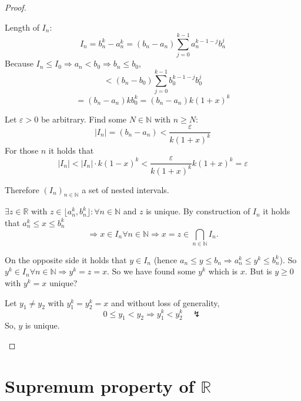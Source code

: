 \documentclass[a4paper,landscape,twocolumn]{article}
\theoremstyle{definition}
\newcommand\abs[1]{\left|#1\right|}
\begin{document}
\begin{proof}
\begin{description}
      Length of $I_n$:
      \[ I_n = b_n^k - a_n^k = (b_n - a_n) \sum_{j=0}^{k-1} a_n^{k-1-j} b_n^j \]
      Because $I_n \leq I_0 \Rightarrow a_n < b_0 \Rightarrow b_n \leq b_0$,
      \[ < (b_n - b_0) \sum_{j=0}^{k-1} b_0^{k-1-j} b_0^{j} \]
      \[ = (b_n - a_n) k b_0^k = (b_n - a_n) k (1 + x)^k \]

      Let $\varepsilon > 0$ be arbitrary. Find some $N \in \mathbb N$ with $n \geq N$:
      \[ \abs{I_n} = (b_n - a_n) < \frac{\varepsilon}{k (1 + x)^k} \]
      For those $n$ it holds that
      \[ \abs{I_n} < \abs{I_n} \cdot k (1 - x)^k < \frac{\varepsilon}{k (1 + x)^k} k (1 + x)^k = \varepsilon \]

      Therefore $(I_n)_{n \in \mathbb N}$ a set of nested intervals.

      $\exists z \in \mathbb R$ with $z \in \lfloor a_n^k, b_n^k\rfloor: \forall n \in \mathbb N$
      and $z$ is unique. By construction of $I_n$ it holds that $a_n^k \leq x \leq b_n^k$
      \[ \Rightarrow x \in I_n \forall n \in \mathbb N \Rightarrow x = z \in \bigcap_{n \in \mathbb N} I_n. \]

      On the opposite side it holds that $y \in I_n$ (hence $a_n \leq y \leq b_n \Rightarrow a_n^k \leq y^k \leq b_n^k$).
      So $y^k \in I_n \forall n \in \mathbb N \Rightarrow y^k = z = x$.
      So we have found some $y^k$ which is $x$. But is $y \geq 0$ with $y^k = x$ unique?

      Let $y_1 \neq y_2$ with $y_1^k = y_2^k = x$ and without loss of generality,
      \[ 0 \leq y_1 < y_2 \Rightarrow y_1^k < y_2^k \quad\lightning \]
      So, $y$ is unique.
  \end{description}
\end{proof}

\section{Supremum property of $\mathbb R$}
\end{document}
